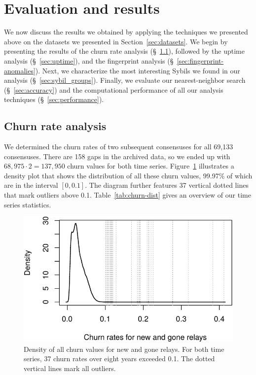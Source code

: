 \section{Evaluation and results}
\label{sec:results}
We now discuss the results we obtained by applying the techniques we presented
above on the datasets we presented in Section~\ref{sec:datasets}.  We begin by
presenting the results of the churn rate analysis (\S~\ref{sec:churn}), followed
by the uptime analysis (\S~\ref{sec:uptime}), and the fingerprint analysis
(\S~\ref{sec:fingerprint-anomalies}).  Next, we characterize the most
interesting Sybils we found in our analysis (\S~\ref{sec:sybil_groups}).
Finally, we evaluate our nearest-neighbor search (\S~\ref{sec:accuracy}) and the
computational performance of all our analysis techniques
(\S~\ref{sec:performance}).

\subsection{Churn rate analysis}
\label{sec:churn}
We determined the churn rates of two subsequent consensuses for all 69,133
consensuses.  There are 158 gaps in the archived data, so we ended up with
$68,975 \cdot 2 = 137,950$ churn values for both time series.
Figure~\ref{fig:churn-density} illustrates a density plot that shows the
distribution of all these churn values, 99.97\% of which are in the interval
$[0, 0.1]$.  The diagram further features 37 vertical dotted lines that mark
outliers above 0.1.  Table~\ref{tab:churn-dist} gives an overview of our time
series statistics.

\begin{figure}[t]
	\centering
	\includegraphics[width=\linewidth]{diagrams/churn-density.pdf}
	\caption{Density of all churn values for new and gone relays.  For both
	time series, 37 churn rates over eight years exceeded 0.1.  The dotted
	vertical lines mark all outliers.}
	\label{fig:churn-density}
\end{figure}

